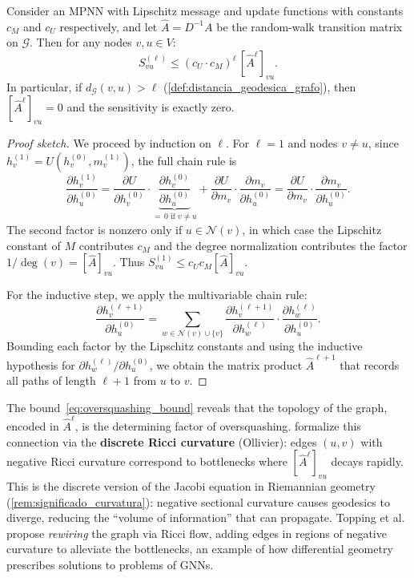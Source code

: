 \begin{proposition}\label{prop:oversquashing_exponencial}
	Consider an \gls{MPNN} with Lipschitz message and update functions with constants $c_M$ and $c_U$ respectively, and let $\hat{A} = D^{-1}A$ be the random-walk transition matrix on $\mathcal{G}$. Then for any nodes $v, u \in V$:
	\begin{equation}\label{eq:oversquashing_bound}
		S_{vu}^{(\ell)} \leq (c_U \cdot c_M)^\ell\, [\hat{A}^\ell]_{vu}.
	\end{equation}
	In particular, if $d_\mathcal{G}(v, u) > \ell$ (\autoref{def:distancia_geodesica_grafo}), then $[\hat{A}^\ell]_{vu} = 0$ and the sensitivity is exactly zero.
\end{proposition}

\begin{proof}[Proof sketch]
	We proceed by induction on $\ell$. For $\ell = 1$ and nodes $v \neq u$,
	since $h_v^{(1)} = U(h_v^{(0)}, m_v^{(1)})$, the full chain rule is
	\[
		\frac{\partial h_v^{(1)}}{\partial h_u^{(0)}}
		= \frac{\partial U}{\partial h_v^{(0)}}
		  \cdot \underbrace{\frac{\partial h_v^{(0)}}{\partial h_u^{(0)}}}_{=\,0 \text{ if } v \neq u}
		+ \frac{\partial U}{\partial m_v}
		  \cdot \frac{\partial m_v}{\partial h_u^{(0)}}
		= \frac{\partial U}{\partial m_v}
		  \cdot \frac{\partial m_v}{\partial h_u^{(0)}}.
	\]
	The second factor is nonzero only if $u \in \mathcal{N}(v)$, in which case
	the Lipschitz constant of $M$ contributes $c_M$ and the degree
	normalization contributes the factor $1/\deg(v) = [\hat{A}]_{vu}$. Thus
	$S_{vu}^{(1)} \leq c_U c_M [\hat{A}]_{vu}$.

	For the inductive step, we apply the multivariable chain rule:
	\[
		\frac{\partial h_v^{(\ell+1)}}{\partial h_u^{(0)}} = \sum_{w \in \mathcal{N}(v) \cup \{v\}} \frac{\partial h_v^{(\ell+1)}}{\partial h_w^{(\ell)}} \cdot \frac{\partial h_w^{(\ell)}}{\partial h_u^{(0)}}.
	\]
	Bounding each factor by the Lipschitz constants and using the inductive hypothesis for $\partial h_w^{(\ell)} / \partial h_u^{(0)}$, we obtain the matrix product $\hat{A}^{\ell+1}$ that records all paths of length $\ell+1$ from $u$ to $v$.
\end{proof}

\begin{remark}\label{rem:curvatura_oversquashing}
	The bound~\eqref{eq:oversquashing_bound} reveals that the topology of the graph, encoded in $\hat{A}^\ell$, is the determining factor of \gls{oversquashing}. \citet{topping2022understanding} formalize this connection via the \textbf{discrete Ricci curvature} (Ollivier): edges $(u,v)$ with negative Ricci curvature correspond to bottlenecks where $[\hat{A}^\ell]_{vu}$ decays rapidly. This is the discrete version of the Jacobi equation in Riemannian geometry (\autoref{rem:significado_curvatura}): negative sectional curvature causes geodesics to diverge, reducing the ``volume of information'' that can propagate. Topping et al. propose \textit{rewiring} the graph via Ricci flow, adding edges in regions of negative curvature to alleviate the bottlenecks, an example of how differential geometry prescribes solutions to problems of \glspl{GNN}.
\end{remark}

